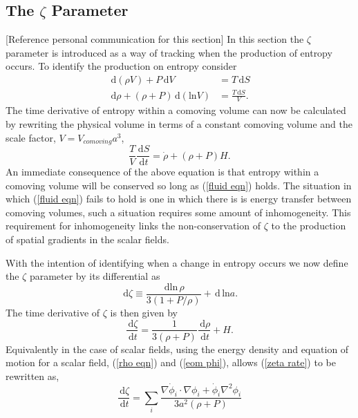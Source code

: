 \documentclass[letterpaper,11pt]{article}
\newcommand{\ud}{\,\mathrm{d}}
\begin{document}
\subsection{The $\zeta$ Parameter} \label{zeta theory}
[Reference personal communication for this section]
In this section the $\zeta$ parameter is introduced as a way of tracking when the production of entropy occurs. To identify the production on entropy consider 
\begin{align}
\ud (\rho V) + P\ud V &= T \ud S \\
\ud \rho + (\rho + P)\ud(\mathrm{ln}V) &= \frac{T\ud S}{V}.
\end{align}
The time derivative of entropy within a comoving volume can now be calculated by rewriting the physical volume in terms of a constant comoving volume and the scale factor, $V=V_{comoving}a^3$,
\begin{equation}
\frac{T}{V}\frac{\ud S}{\ud t} = \dot{\rho} + (\rho + P)H. \label{S rate}
\end{equation}
An immediate consequence of the above equation is that entropy within a comoving volume will be conserved so long as (\ref{fluid eqn}) holds. The situation in which (\ref{fluid eqn}) fails to hold is one in which there is is energy transfer between comoving volumes, such a situation requires some amount of inhomogeneity. This requirement for inhomogeneity links the non-conservation of $\zeta$ to the production of spatial gradients in the scalar fields.

With the intention of identifying when a change in entropy occurs we now define the $\zeta$ parameter by its differential as
\begin{equation}
\ud \zeta \equiv \frac{\ud \mathrm{ln}\,\rho}{3(1+P/\rho)} + \ud\, \mathrm{ln} a.
\end{equation}
The time derivative of $\zeta$ is then given by
\begin{equation}
\frac{\ud \zeta}{\ud t} = \frac{1}{3(\rho + P)}\frac{\ud \rho}{\ud t} + H. \label{zeta rate}
\end{equation}
Equivalently in the case of scalar fields, using the energy density and equation of motion for a scalar field, (\ref{rho eqn}) and (\ref{eom phi}), allows (\ref{zeta rate}) to be rewritten as,
\begin{equation}
\frac{\ud \zeta}{\ud t} = \sum_i \frac{\nabla \dot{\phi}_i \cdot \nabla \phi_i + \dot{\phi}_i\nabla^2\phi_i}{3a^2(\rho + P)} \label{zeta source}
\end{equation}
\end{document}
